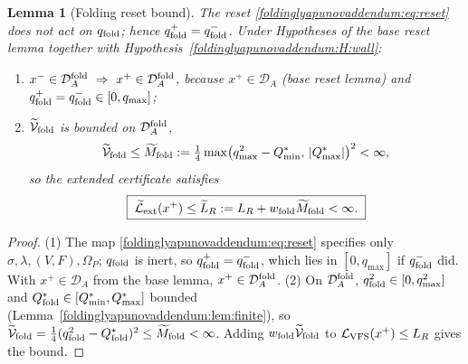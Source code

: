 \documentclass[11pt,a4paper,oneside]{book}
\newcommand{\LV}{\mathcal L_{\rm VFS}}
\newcommand{\DA}{\mathcal D_A}
\newcommand{\DAf}{\mathcal D_A^{\rm fold}}
\newcommand{\Om}{\Omega_P}
\newcommand{\qf}{q_{\rm fold}}
\newcommand{\Qs}{Q_{\rm fold}^{*}}
\newcommand{\Vt}{\widetilde{\mathcal V}_{\rm fold}}
\newcommand{\Lt}{\widetilde{\mathcal L}_{\rm ext}}
\theoremstyle{plain}
\newtheorem{lemma}{Lemma}[chapter]
\theoremstyle{definition}
\theoremstyle{remark}
\begin{document}
\begin{lemma}[Folding reset bound]\label{foldinglyapunovaddendum:lem:resetfold}
The reset \eqref{foldinglyapunovaddendum:eq:reset} does not act on $\qf$; hence $\qf^{+}=\qf^{-}$. Under
Hypotheses of the base reset lemma together with Hypothesis~\ref{foldinglyapunovaddendum:H:wall}:
\begin{enumerate}[label=(\arabic*),leftmargin=2em,itemsep=2pt]
\item $x^-\in\DAf\ \Rightarrow\ x^+\in\DAf$, because $x^+\in\DA$ (base reset lemma) and
$\qf^{+}=\qf^{-}\in[0,q_{\max}]$;
\item $\Vt$ is bounded on $\DAf$,
\begin{equation}
\Vt\le\widetilde M_{\rm fold}:=\tfrac14\max\bigl(q_{\max}^{2}-Q^{*}_{\min},\,|Q^{*}_{\max}|\bigr)^{2}<\infty,
\end{equation}
so the extended certificate satisfies
\begin{equation}
\boxed{\;\Lt(x^+)\le \widetilde L_R:=L_R+w_{\rm fold}\widetilde M_{\rm fold}<\infty.\;}
\end{equation}
\end{enumerate}
\end{lemma}
\begin{proof}
(1) The map \eqref{foldinglyapunovaddendum:eq:reset} specifies only $\sigma,\lambda,(V,F),\Om$; $\qf$ is inert, so
$\qf^{+}=\qf^{-}$, which lies in $[0,q_{\max}]$ if $\qf^{-}$ did. With $x^+\in\DA$ from the base lemma,
$x^+\in\DAf$. (2) On $\DAf$, $\qf^{2}\in[0,q_{\max}^{2}]$ and $\Qs\in[Q^{*}_{\min},Q^{*}_{\max}]$ bounded
(Lemma~\ref{foldinglyapunovaddendum:lem:finite}), so $\Vt=\tfrac14(\qf^{2}-\Qs)^{2}\le\widetilde M_{\rm fold}<\infty$. Adding
$w_{\rm fold}\Vt$ to $\LV(x^+)\le L_R$ gives the bound.
\end{proof}
\end{document}
